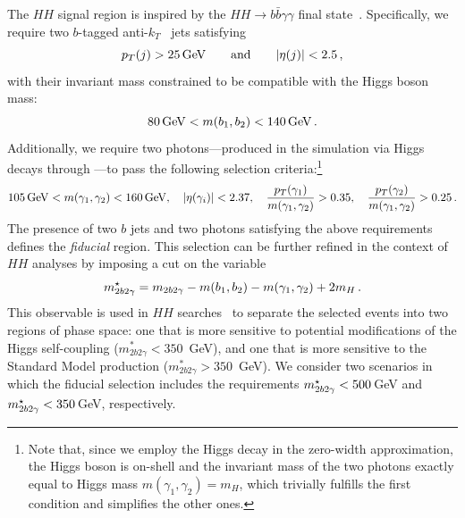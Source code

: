 \documentclass[11pt,a4paper]{article}
\begin{document}
The $HH$ signal region is inspired by the $HH \to b\bar{b}\gamma\gamma$ final state~\cite{HDBS-2021-10,CMS-HIG-19-018}. Specifically, we require two $b$-tagged anti-$k_T$~\cite{Cacciari:2005hq,Cacciari:2008gp,Cacciari:2011ma} jets satisfying
\begin{equation}
\label{eq:ptjcuts}
p_T(j) > 25\,\mathrm{GeV} \qquad {\rm and} \qquad |\eta(j)| < 2.5\,,
\end{equation}
with their invariant mass constrained to be compatible with the Higgs boson mass:
\begin{equation}
    \label{eq:mbjcut}
    80\,\mathrm{GeV} < m(b_1,b_2)< 140\,\mathrm{GeV}\,.
\end{equation}
Additionally, we require two photons—produced in the simulation via Higgs decays through —to pass the following selection criteria:\footnote{Note that, since
we employ the Higgs decay in the zero-width approximation, the Higgs boson is on-shell and the invariant mass of the two photons exactly equal to Higgs mass
$m(\gamma_1, \gamma_2)=m_H$, which trivially fulfills the first condition and simplifies the other ones.}
\begin{equation}
\label{eq:photoncuts}
    105\,\mathrm{GeV} < m(\gamma_1, \gamma_2) < 160\,\mathrm{GeV}, \quad |\eta(\gamma_i)|< 2.37, \quad
    \frac{p_T(\gamma_1)}{m(\gamma_1, \gamma_2)} > 0.35, \quad \frac{p_T(\gamma_2)}{m(\gamma_1, \gamma_2)} > 0.25\,.
\end{equation}
The presence of two $b$ jets and two photons satisfying the above requirements defines the \emph{fiducial} region. This selection can be further refined in the context of $HH$ analyses by imposing a cut on the variable
\begin{equation}
\label{eq:mbbggs}
    m_{2b2\gamma}^{\star} = m_{2b2\gamma} - m(b_1,b_2) - m(\gamma_1,\gamma_2) + 2m_H \,.
\end{equation}
This observable is used in $HH$ searches~\cite{HDBS-2021-10,HDBS-2019-27,CMS-HIG-19-018,ATLAS:2025hhd} to separate the selected events into two regions of phase space: one that is more sensitive to potential modifications of the Higgs self-coupling ($m_{2b2\gamma}^{*} < 350$~GeV), and one that is more sensitive to the Standard Model production ($m_{2b2\gamma}^{*} > 350$~GeV). We consider two scenarios in which the fiducial selection includes the requirements $m_{2b2\gamma}^{\star} < 500$\,GeV and $m_{2b2\gamma}^{\star} < 350$\,GeV, respectively. 
\end{document}
